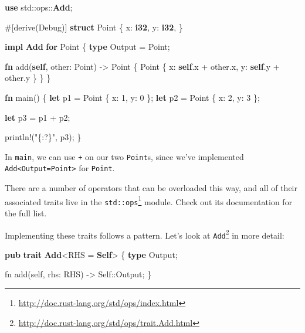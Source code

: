 \documentclass[a4paper,]{book}
\newenvironment{Shaded}{\begin{snugshade}}{\end{snugshade}}
\newcommand{\KeywordTok}[1]{\textcolor[rgb]{0.13,0.29,0.53}{\textbf{{#1}}}}
\newcommand{\DecValTok}[1]{\textcolor[rgb]{0.00,0.00,0.81}{{#1}}}
\newcommand{\StringTok}[1]{\textcolor[rgb]{0.31,0.60,0.02}{{#1}}}
\newcommand{\OtherTok}[1]{\textcolor[rgb]{0.56,0.35,0.01}{{#1}}}
\newcommand{\NormalTok}[1]{{#1}}
\renewcommand{\href}[2]{#2\footnote{\url{#1}}}
\begin{document}
\begin{Shaded}
\begin{Highlighting}[]
\KeywordTok{use} \NormalTok{std::ops::}\KeywordTok{Add}\NormalTok{;}

\OtherTok{#[}\NormalTok{derive}\OtherTok{(}\NormalTok{Debug}\OtherTok{)]}
\KeywordTok{struct} \NormalTok{Point \{}
    \NormalTok{x: }\KeywordTok{i32}\NormalTok{,}
    \NormalTok{y: }\KeywordTok{i32}\NormalTok{,}
\NormalTok{\}}

\KeywordTok{impl} \KeywordTok{Add} \KeywordTok{for} \NormalTok{Point \{}
    \KeywordTok{type} \NormalTok{Output = Point;}

    \KeywordTok{fn} \NormalTok{add(}\KeywordTok{self}\NormalTok{, other: Point) -> Point \{}
        \NormalTok{Point \{ x: }\KeywordTok{self}\NormalTok{.x + other.x, y: }\KeywordTok{self}\NormalTok{.y + other.y \}}
    \NormalTok{\}}
\NormalTok{\}}

\KeywordTok{fn} \NormalTok{main() \{}
    \KeywordTok{let} \NormalTok{p1 = Point \{ x: }\DecValTok{1}\NormalTok{, y: }\DecValTok{0} \NormalTok{\};}
    \KeywordTok{let} \NormalTok{p2 = Point \{ x: }\DecValTok{2}\NormalTok{, y: }\DecValTok{3} \NormalTok{\};}

    \KeywordTok{let} \NormalTok{p3 = p1 + p2;}

    \OtherTok{println!}\NormalTok{(}\StringTok{"\{:?\}"}\NormalTok{, p3);}
\NormalTok{\}}
\end{Highlighting}
\end{Shaded}

In \texttt{main}, we can use \texttt{+} on our two \texttt{Point}s,
since we've implemented
\texttt{Add\textless{}Output=Point\textgreater{}} for \texttt{Point}.

There are a number of operators that can be overloaded this way, and all
of their associated traits live in the
\href{http://doc.rust-lang.org/std/ops/index.html}{\texttt{std::ops}}
module. Check out its documentation for the full list.

Implementing these traits follows a pattern. Let's look at
\href{http://doc.rust-lang.org/std/ops/trait.Add.html}{\texttt{Add}} in
more detail:

\begin{Shaded}
\begin{Highlighting}[]
\KeywordTok{pub} \KeywordTok{trait} \KeywordTok{Add}\NormalTok{<RHS = }\KeywordTok{Self}\NormalTok{> \{}
    \KeywordTok{type} \NormalTok{Output;}

    \NormalTok{fn add(self, rhs: RHS) -> Self::Output;}
\NormalTok{\}}
\end{Highlighting}
\end{Shaded}
\end{document}
